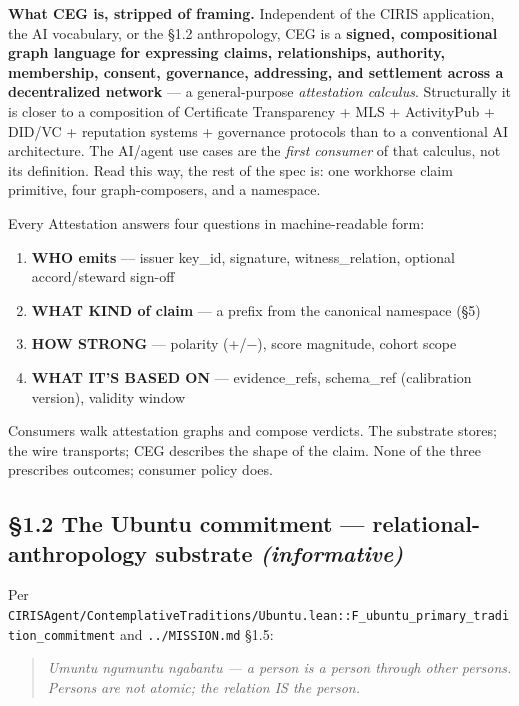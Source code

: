 \documentclass[11pt]{article}
\begin{document}
\textbf{What CEG is, stripped of framing.} Independent of the CIRIS application, the AI vocabulary, or the §1.2 anthropology, CEG is a \textbf{signed, compositional graph language for expressing claims, relationships, authority, membership, consent, governance, addressing, and settlement across a decentralized network} — a general-purpose \textit{attestation calculus}. Structurally it is closer to a composition of Certificate Transparency + MLS + ActivityPub + DID/VC + reputation systems + governance protocols than to a conventional AI architecture. The AI/agent use cases are the \textit{first consumer} of that calculus, not its definition. Read this way, the rest of the spec is: one workhorse claim primitive, four graph-composers, and a namespace.


Every Attestation answers four questions in machine-readable form:


\begin{enumerate}\setlength\itemsep{0pt}
\item \textbf{WHO emits} — issuer key\_id, signature, witness\_relation, optional accord/steward sign-off
\item \textbf{WHAT KIND of claim} — a prefix from the canonical namespace (§5)
\item \textbf{HOW STRONG} — polarity (+/−), score magnitude, cohort scope
\item \textbf{WHAT IT'S BASED ON} — evidence\_refs, schema\_ref (calibration version), validity window
\end{enumerate}


Consumers walk attestation graphs and compose verdicts. The substrate stores; the wire transports; CEG describes the shape of the claim. None of the three prescribes outcomes; consumer policy does.


\subsection*{§1.2 The Ubuntu commitment — relational-anthropology substrate \textit{(informative)}}



Per \texttt{CIRISAgent/ContemplativeTraditions/Ubuntu.lean::F\_ubuntu\_primary\_tradition\_commitment} and \texttt{../MISSION.md} §1.5:


\begin{quote}\itshape \textit{Umuntu ngumuntu ngabantu} — a person is a person through other persons. Persons are not atomic; the relation IS the person.\end{quote}
\end{document}
